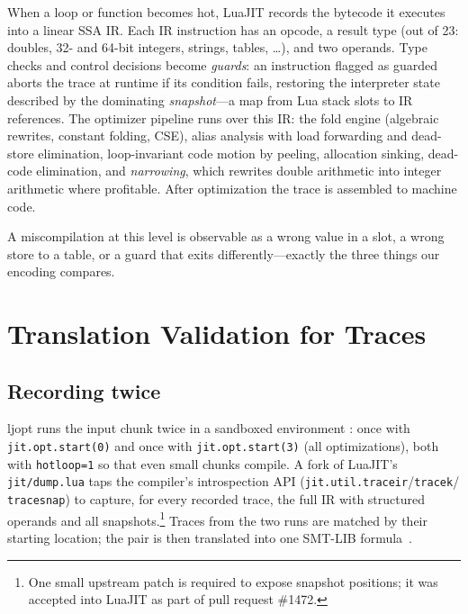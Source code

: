 \documentclass[runningheads]{llncs}
\newcommand{\full}[1]{#1}
\newcommand{\brief}[1]{}
\newcommand{\cut}[2]{#2}
\newcommand{\full}[1]{}
\newcommand{\brief}[1]{#1}
\newcommand{\cut}[2]{#1}
\newcommand{\ljopt}{\textsf{ljopt}}
\begin{document}
When a loop or function becomes hot, LuaJIT records the bytecode it
executes into a linear SSA IR.\full{ Each IR instruction has an opcode, a
result type (out of 23: doubles, 32- and 64-bit integers, strings, tables,
\dots), and two operands.} Type checks and control decisions become
\emph{guards}: \full{an instruction flagged as guarded aborts the trace at
runtime if its condition fails, restoring}\brief{each restores} the
interpreter state described by the dominating \emph{snapshot}\full{---a map
from Lua stack slots to IR references}. The optimizer pipeline runs over
this IR: the fold engine\full{ (algebraic rewrites, constant folding, CSE)},
alias analysis with load forwarding and dead-store elimination,
loop-invariant code motion by peeling, allocation sinking, dead-code
elimination, and \emph{narrowing}\full{, which rewrites double arithmetic
into integer arithmetic where profitable}. After optimization the trace is
assembled to machine code.

A miscompilation at this level is observable as a wrong value in a slot, a
wrong store to a table, or a guard that exits differently---exactly the
three things our encoding compares.

\section{Translation Validation for Traces}\label{sec:tv}

\subsection{Recording twice}

\ljopt{} runs the input chunk twice in a sandboxed environment%
\cut{---optimizations off and at \texttt{-O3}, with \texttt{hotloop=1} so
small chunks compile---and captures}{: once with
\texttt{jit.opt.start(0)} and once with \texttt{jit.opt.start(3)} (all
optimizations), both with \texttt{hotloop=1} so that even small chunks
compile. A fork of LuaJIT's \texttt{jit/dump.lua} taps the compiler's
introspection API (\texttt{jit.util.traceir}/\texttt{tracek}/%
\texttt{tracesnap}) to capture}, for every recorded trace, the full IR
with structured operands and all snapshots.\full{\footnote{One small
upstream patch is required to expose snapshot positions; it was accepted
into LuaJIT as part of pull request \#1472.}} Traces from the two runs are
matched by their starting location; the pair is then translated into one
SMT-LIB formula~\cite{smtlib26}.
\end{document}
